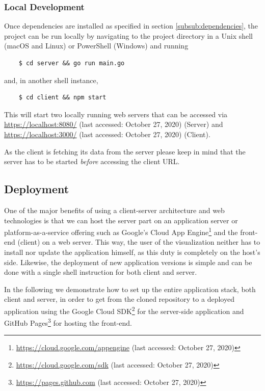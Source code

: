 \subsubsection{Local Development}
Once dependencies are installed as specified in section \ref{subsub:dependencies}, the project can be run locally by navigating to the project directory in a Unix shell (macOS and Linux) or PowerShell (Windows) and running

\begin{verbatim}
    $ cd server && go run main.go
\end{verbatim}
and, in another shell instance,
\begin{verbatim}
    $ cd client && npm start
\end{verbatim}

This will start two locally running web servers that can be accessed via \url{https://localhost:8080/} (last accessed: October 27, 2020) (Server) and \url{https://localhost:3000/} (last accessed: October 27, 2020) (Client).

\begin{note}
As the client is fetching its data from the server please keep in mind that the server has to be started \textit{before} accessing the client URL.
\end{note}

\subsection{Deployment}

One of the major benefits of using a client-server architecture and web technologies is that we can host the server part on an application server or platform-as-a-service offering such as Google's Cloud App Engine\footnote{\url{https://cloud.google.com/appengine} (last accessed: October 27, 2020)} and the front-end (client) on a web server.
This way, the user of the visualization neither has to install nor update the application himself, as this duty is completely on the host's side. Likewise, the deployment of new application versions is simple and can be done with a single shell instruction for both client and server.

In the following we demonstrate how to set up the entire application stack, both client and server, in order to get from the cloned repository to a deployed application using the Google Cloud SDK\footnote{\url{https://cloud.google.com/sdk} (last accessed: October 27, 2020)} for the server-side application and GitHub Pages\footnote{\url{https://pages.github.com} (last accessed: October 27, 2020)} for hosting the front-end.
\newpage

